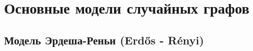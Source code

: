 \documentclass[t]{beamer}
\begin{document}
    
    \frame{\titlepage}
    
    \section{Основные модели случайных графов}
    \subsection{Модель Эрдеша-Реньи (Erdős - Rényi)} 
    
    \begin{frame}
       
    \end{frame}	
    
    \begin{frame}
        
    \end{frame}	

    \begin{frame}
        
    \end{frame}	
    
    \begin{frame}
        
    \end{frame}	
    
    \begin{frame}
        
    \end{frame}	

    \begin{frame}
        
    \end{frame}	

    \begin{frame}
        
    \end{frame}	
\end{document}
